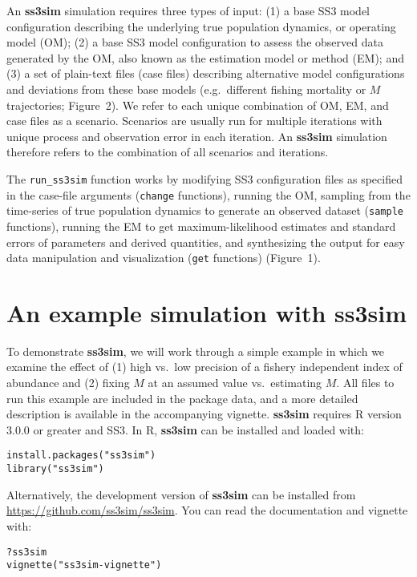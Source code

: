 \documentclass[10pt]{article}
\begin{document}
An \textbf{ss3sim} simulation requires three types of input: (1) a base SS3
model configuration describing the underlying true population dynamics, or
operating model (OM); (2) a base SS3 model configuration to assess the observed
data generated by the OM, also known as the estimation model or method (EM);
and (3) a set of plain-text files (case files) describing alternative model
configurations and deviations from these base models (e.g.~different fishing
mortality or $M$ trajectories; Figure~2). We refer to each unique
combination of OM, EM, and case files as a scenario. Scenarios are usually run
for multiple iterations with unique process and observation error in each
iteration. An \textbf{ss3sim} simulation therefore refers to the combination of
all scenarios and iterations.

The \texttt{run\_ss3sim} function works by modifying SS3 configuration files as
specified in the case-file arguments (\texttt{change} functions), running the
OM, sampling from the time-series of true population dynamics to generate an
observed dataset (\texttt{sample} functions), running the EM to get
maximum-likelihood estimates and standard errors of parameters and
derived quantities, and synthesizing the output for easy data
manipulation and visualization (\texttt{get} functions) (Figure~1).

\section*{An example simulation with ss3sim}

To demonstrate \textbf{ss3sim}, we will work through a simple example in which
we examine the effect of (1) high vs.~low precision of a fishery independent
index of abundance and (2) fixing $M$ at an assumed value vs.~estimating
$M$. All files to run this example are included in the package data, and a more
detailed description is available in the accompanying vignette.
\textbf{ss3sim} requires \textsf{R} version 3.0.0 or greater and SS3. In \textsf{R}, \textbf{ss3sim} can be
installed and loaded with:

\begin{verbatim}
install.packages("ss3sim")
library("ss3sim")
\end{verbatim}

\noindent
Alternatively, the development version of \textbf{ss3sim} can be installed from
\url{https://github.com/ss3sim/ss3sim}. You can read the documentation and
vignette with:

\begin{verbatim}
?ss3sim
vignette("ss3sim-vignette")
\end{verbatim}
\end{document}
